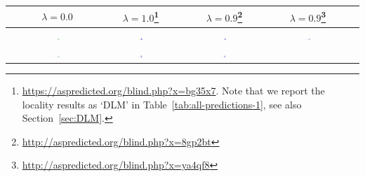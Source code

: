 \documentclass[10pt,twoside,lineno]{article}
\begin{document}
\begin{table}[hbt!]
	\begin{center}
\small{
\begin{tabular}{|c|c|ccc|c}
	\hline
& $\lambda = 0.0$
& $\lambda=1.0$\footnote{\url{https://aspredicted.org/blind.php?x=bg35x7}. Note that we report the locality results as `DLM' in Table~\ref{tab:all-predictions-1}, see also Section~\ref{sec:DLM}.} 
& $\lambda=0.9$\footnote{\url{http://aspredicted.org/blind.php?x=8gp2bt}}
& $\lambda=0.9$\footnote{\url{http://aspredicted.org/blind.php?x=ya4qf8}} 
	\\ \hline \hline 
	\multirow{2}{*}{\raisebox{.5pt}{\textcircled{\raisebox{-.9pt} {1}}}}		  
		&   \multirow{2}{*}{  \includegraphics[width=0.06\textwidth]{../results/correlations/figures/posteriors/posterior_perRelation_Parseability_lifted_case.pdf}   }
		&   \multirow{2}{*}{  \includegraphics[width=0.06\textwidth]{../results/correlations/figures/posteriors/posterior_first10_Efficiency_lifted_case.pdf}     } 
 		&   \multirow{2}{*}{  \includegraphics[width=0.06\textwidth]{../results/correlations/figures/posteriors/posterior_first09_Efficiency_lifted_case.pdf}     }  
		&   \multirow{2}{*}{  \includegraphics[width=0.06\textwidth]{../results/correlations/figures/posteriors/posterior_Efficiency_lifted_case.pdf}     }  
		\\
&&&\\ \hline
	\multirow{2}{*}{\raisebox{.5pt}{\textcircled{\raisebox{-.9pt} {2}}}}	 
		&   \multirow{2}{*}{  \includegraphics[width=0.06\textwidth]{../results/correlations/figures/posteriors/posterior_perRelation_Parseability_lifted_cop.pdf}   }
		&   \multirow{2}{*}{  \includegraphics[width=0.06\textwidth]{../results/correlations/figures/posteriors/posterior_first10_Efficiency_lifted_cop.pdf}     }  
		&   \multirow{2}{*}{  \includegraphics[width=0.06\textwidth]{../results/correlations/figures/posteriors/posterior_first09_Efficiency_lifted_cop.pdf}     }  

\end{tabular}}
\end{center}
\end{table}
\end{document}
